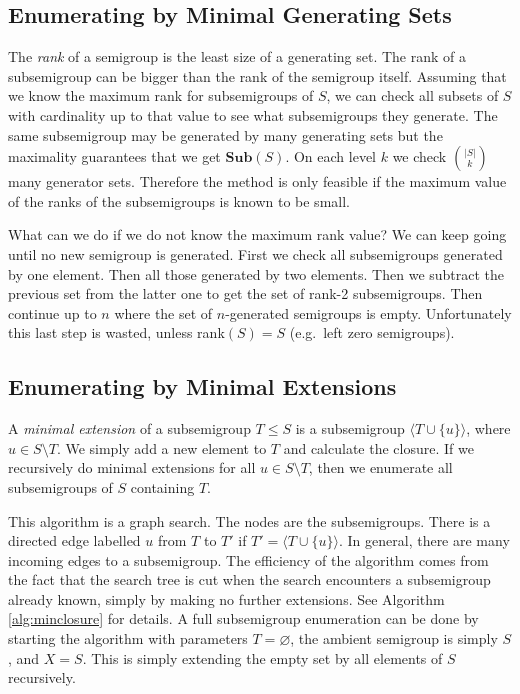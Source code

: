 \documentclass{amsart}
\newcommand{\Sub}{\mathbf{Sub}}
\theoremstyle{plain}
\theoremstyle{definition}
\begin{document}
 
\subsection{Enumerating by Minimal Generating Sets}
\label{sec:mingen}
The \emph{rank} of a semigroup is the least size of a  generating set.
The rank of a subsemigroup can be bigger than the rank of the semigroup itself. 
Assuming that we know the maximum rank for subsemigroups of $S$, we can check all subsets of $S$ with cardinality up to that value to see what subsemigroups they generate.
The same subsemigroup may be generated by many generating sets but the maximality guarantees that we get $\Sub(S)$.
On each level $k$ we check $\binom{|S|}{k}$ many generator sets.
Therefore the method is only feasible if the maximum value of the ranks of the subsemigroups is known to be small. 

What can we do if we do not know the maximum rank value?
We can keep going until no new semigroup is generated.
First we check all subsemigroups generated by one element.
Then all those generated by two elements.
Then we subtract the previous set from the latter one to get the set of rank-2 subsemigroups.
Then continue up to $n$ where the set of $n$-generated semigroups is empty.
Unfortunately this last step is wasted, unless rank$(S)=S$ (e.g.~left zero semigroups).
\subsection{Enumerating by Minimal Extensions}
\label{sec:minext}

A \emph{minimal extension} of a subsemigroup $T\leq S$ is a subsemigroup $\langle T\cup\{u\}\rangle$, where $u\in S\setminus T$.
We simply add a new element to $T$ and calculate the closure.
If we recursively do minimal extensions for all $u\in S\setminus T$, then we enumerate all subsemigroups of $S$ containing $T$.

This algorithm is a graph search.
The nodes are the subsemigroups.
There is a directed edge labelled $u$ from $T$ to $T'$ if $T'=\langle T\cup\{u\}\rangle$.
In general, there are many incoming edges to a subsemigroup.
The efficiency of the algorithm  comes from the fact that the search tree is cut when the search encounters a subsemigroup already known, simply by making no further extensions.
See Algorithm \ref{alg:minclosure} for details.
A full subsemigroup enumeration can be done by starting the algorithm with parameters $T=\varnothing$, the ambient semigroup is simply $S$, and  $X=S$.
This is simply extending the empty set by all elements of $S$ recursively.
\end{document}
